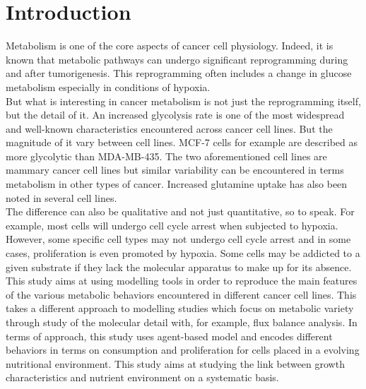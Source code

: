 \documentclass[11pt,a4paper]{article}
\begin{document}
\tableofcontents
\newpage
\section{Introduction}
Metabolism is one of the core aspects of cancer cell physiology. Indeed, it is known that metabolic pathways can undergo significant reprogramming during and after tumorigenesis. This reprogramming often includes a change in glucose metabolism especially in conditions of hypoxia.\cite{Cook2021}\cite{Rodriguez2008}\cite{Griguer2005}\cite{DeBerardinis2008}\cite{Stuart2023}\\

But what is interesting in cancer metabolism is not just the reprogramming itself, but the detail of it. An increased glycolysis rate is one of the most widespread and well-known characteristics encountered across cancer cell lines. But the magnitude of it vary between cell lines. MCF-7 cells for example are described as more glycolytic than MDA-MB-435.\cite{Mazurek1997} The two aforementioned cell lines are mammary cancer cell lines but similar variability can be encountered in terms metabolism in other types of cancer.\cite{Kammerer2015} Increased glutamine uptake has also been noted in several cell lines.\cite{Natarajan2019}  \\

The difference can also be qualitative and not just quantitative, so to speak. For example, most cells will undergo cell cycle arrest when subjected to hypoxia.\cite{Bayar2021}\cite{Waker2018}\cite{Hubbi2015} However, some specific cell types may not undergo cell cycle arrest and in some cases, proliferation is even promoted by hypoxia.\cite{Tang2019}\cite{Miao2020}\cite{Li2023} Some cells may be addicted to a given substrate if they lack the molecular apparatus to make up for its absence.\cite{Jiang2016}\\

This study aims at using modelling tools in order to reproduce the main features of the various metabolic behaviors encountered in different cancer cell lines. This takes a different approach to modelling studies which focus on metabolic variety through study of the molecular detail with, for example, flux balance analysis.\cite{Orth2010}\cite{Ng2022}\cite{Damiani2017} In terms of approach, this study uses agent-based model and encodes different behaviors in terms on consumption and proliferation for cells placed in a evolving nutritional environment. This study aims at studying the link between growth characteristics and nutrient environment on  a systematic basis.\\
\end{document}
